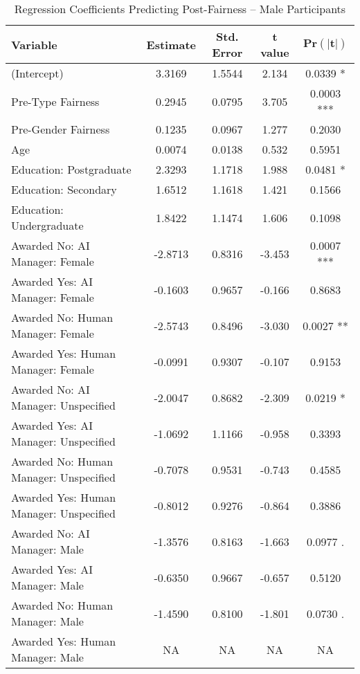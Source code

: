 \begin{table}[ht]
    \centering
    \caption{Regression Coefficients Predicting Post-Fairness -- Male Participants}
    \begin{tabular}{lcccc}
        \toprule
        \textbf{Variable} & \textbf{Estimate} & \textbf{Std. Error} & \textbf{t value} & 
        $\mathbf{\text{Pr}(|t|)}$
        \\
        \midrule
        (Intercept) & 3.3169  & 1.5544  & 2.134  & 0.0339 *  \\
        Pre-Type Fairness & 0.2945  & 0.0795  & 3.705  & 0.0003 ***  \\
        Pre-Gender Fairness & 0.1235  & 0.0967  & 1.277  & 0.2030  \\
        Age & 0.0074  & 0.0138  & 0.532  & 0.5951  \\
        Education: Postgraduate & 2.3293  & 1.1718  & 1.988  & 0.0481 *  \\
        Education: Secondary & 1.6512  & 1.1618  & 1.421  & 0.1566  \\
        Education: Undergraduate & 1.8422  & 1.1474  & 1.606  & 0.1098  \\
        Awarded No: AI Manager: Female & -2.8713  & 0.8316  & -3.453  & 0.0007 ***  \\
        Awarded Yes: AI Manager: Female & -0.1603  & 0.9657  & -0.166  & 0.8683  \\
        Awarded No: Human Manager: Female & -2.5743  & 0.8496  & -3.030  & 0.0027 **  \\
        Awarded Yes: Human Manager: Female & -0.0991  & 0.9307  & -0.107  & 0.9153  \\
        Awarded No: AI Manager: Unspecified & -2.0047  & 0.8682  & -2.309  & 0.0219 *  \\
        Awarded Yes: AI Manager: Unspecified & -1.0692  & 1.1166  & -0.958  & 0.3393  \\
        Awarded No: Human Manager: Unspecified & -0.7078  & 0.9531  & -0.743  & 0.4585  \\
        Awarded Yes: Human Manager: Unspecified & -0.8012  & 0.9276  & -0.864  & 0.3886  \\
        Awarded No: AI Manager: Male & -1.3576  & 0.8163  & -1.663  & 0.0977 .  \\
        Awarded Yes: AI Manager: Male & -0.6350  & 0.9667  & -0.657  & 0.5120  \\
        Awarded No: Human Manager: Male & -1.4590  & 0.8100  & -1.801  & 0.0730 .  \\
        Awarded Yes: Human Manager: Male & NA  & NA  & NA  & NA  \\

\end{tabular}
\end{table}
